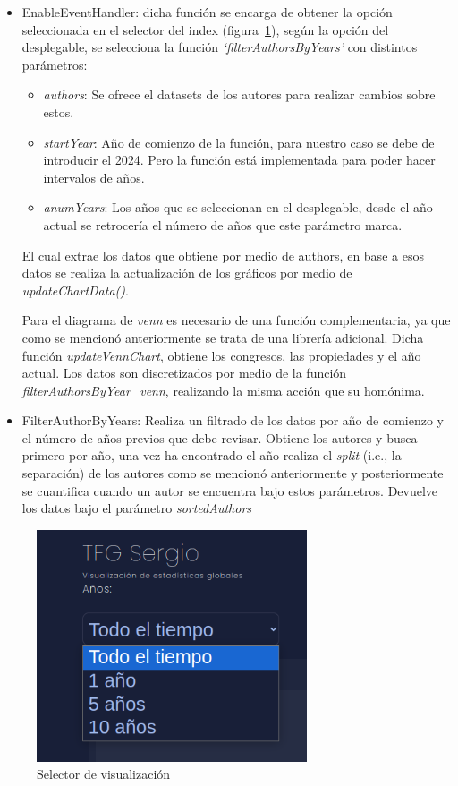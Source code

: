 \documentclass[a4paper, 12pt]{book}
\begin{document}
\begin{itemize}
    \item EnableEventHandler: dicha función se encarga de obtener la opción seleccionada en el selector del index (figura~\ref{fig:selector}), según la opción del desplegable, se selecciona la función \textit{`filterAuthorsByYears'} con distintos parámetros:
    \begin{itemize}
        \item \textit{authors}: Se ofrece el datasets de los autores para realizar cambios sobre estos.
        \item \textit{startYear}: Año de comienzo de la función, para nuestro caso se debe de introducir el 2024.
        Pero la función está implementada para poder hacer intervalos de años.
        \item \textit{anumYears}: Los años que se seleccionan en el desplegable, desde el año actual se retrocería el número de años que este parámetro marca.
    \end{itemize}
    
    El cual extrae los datos que obtiene por medio de authors, en base a esos datos se realiza la actualización de los gráficos por medio de \textit{updateChartData()}. 

    Para el diagrama de \emph{venn} es necesario de una función complementaria, ya que como se mencionó anteriormente se trata de una librería adicional. Dicha función \textit{updateVennChart}, obtiene los congresos, las propiedades y el año actual. Los datos son discretizados por medio de la función \textit{filterAuthorsByYear\_venn}, realizando la misma acción que su homónima.

    \item FilterAuthorByYears: Realiza un filtrado de los datos por año de comienzo y el número de años previos que debe revisar. Obtiene los autores y busca primero por año, una vez ha encontrado el año realiza el \emph{split} (i.e., la separación) de los autores como se mencionó anteriormente y posteriormente se cuantifica cuando un autor se encuentra bajo estos parámetros. Devuelve los datos bajo el parámetro \textit{sortedAuthors}
\end{itemize}

\begin{figure}[h]
  \centering
  \includegraphics[width=8cm, keepaspectratio]{img/selector.png}
  \caption{Selector de visualización}
  \label{fig:selector}
\end{figure}
\end{document}
